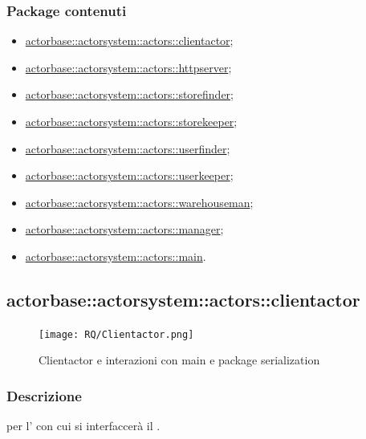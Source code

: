 \documentclass{scalatekids-article}
\begin{document}
\subsubsection{Package contenuti}
\begin{itemize}
\item \hyperref[sec:actorbase::actorsystem::actors::clientactor]{actorbase::actorsystem::actors::clientactor};
\item \hyperref[sec:actorbase::actorsystem::actors::httpserver]{actorbase::actorsystem::actors::httpserver};
\item \hyperref[sec:actorbase::actorsystem::actors::storefinder]{actorbase::actorsystem::actors::storefinder};
\item \hyperref[sec:actorbase::actorsystem::actors::storekeeper]{actorbase::actorsystem::actors::storekeeper};
\item \hyperref[sec:actorbase::actorsystem::actors::userfinder]{actorbase::actorsystem::actors::userfinder};
\item \hyperref[sec:actorbase::actorsystem::actors::userkeeper]{actorbase::actorsystem::actors::userkeeper};
\item \hyperref[sec:actorbase::actorsystem::actors::warehouseman]{actorbase::actorsystem::actors::warehouseman};
\item \hyperref[sec:actorbase::actorsystem::actors::manager]{actorbase::actorsystem::actors::manager};
\item \hyperref[sec:actorbase::actorsystem::actors::main]{actorbase::actorsystem::actors::main}.
\end{itemize}

\subsection{actorbase::actorsystem::actors::clientactor}
\label{sec:actorbase::actorsystem::actors::clientactor}

\begin{figure}[H]
  \begin{center}
    \texttt{[image: RQ/Clientactor.png]}
    \caption{Clientactor e interazioni con main e package serialization}
  \end{center}
\end{figure}

\subsubsection{Descrizione}

 per l' con cui si interfaccerà il .
\end{document}
